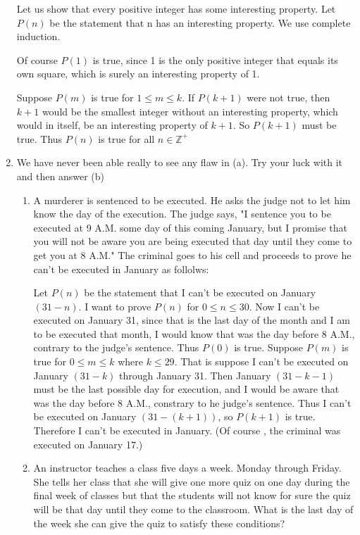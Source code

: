 \documentclass[10pt,letterpaper]{article}
\begin{document}
\begin{enumerate}
Let us show that every positive integer has some interesting property. Let $P(n)$ be the statement that n has an interesting property. We use complete induction.

Of course $P(1)$ is true, since 1 is the only positive integer that equals its own square, which is surely an interesting property of 1.

Suppose $P(m)$ is true for $1 \le m \le k$. If $P(k+1)$ were not true, then $k+1$ would be the smallest integer without an interesting property, 
which would in itself, be an interesting property of $k+1$. So $P(k+1)$ must be true. Thus $P(n)$ is true for all $n \in \mathbb{Z}^+$

\item We have never been able really to see any flaw in (a). Try your luck with it and then answer (b)
\begin{enumerate}
  \item A murderer is sentenced to be executed. He asks the judge not to let him know the day of the execution. The judge says, "I sentence you to be executed at 9 A.M. some day of this coming January, but I promise that you will not be aware you are being executed that day until they come to  get you at 8 A.M." The criminal goes to his cell and proceeds to prove he can't be executed in January as follolws:

  Let $P(n)$ be the statement that I can't be executed on  January $(31-n)$. I want to prove $P(n)$ for $0 \le n \le 30$. Now I can't be executed on January 31, since that is the last day of the month and I am to be executed that month, I would know that was the day before 8 A.M., contrary to the judge's sentence. Thus $P(0)$ is true. Suppose $P(m)$ is true for $0 \le m \le k$ where $k \le 29$. That is suppose I can't be executed on January $(31-k)$ through January 31. Then January $(31 - k -1)$ must be the last possible day for execution, and I would be  aware that was the day before 8 A.M., constrary to he judge's sentence. Thus I can't be executed on January $(31 - (k+1))$, so $P(k+1)$ is true. Therefore I can't be executed in January.
  (Of course , the criminal was executed on January 17.)
  
  \item An instructor teaches a class five days a week. Monday through Friday. She tells her class that she will give one more quiz on one day during the final week of classes but that the students will not know for sure the quiz will be that day until they come to the classroom. What is the last day of the week she can give the quiz to satisfy these conditions? 
\end{enumerate}

\end{enumerate}
\end{document}
